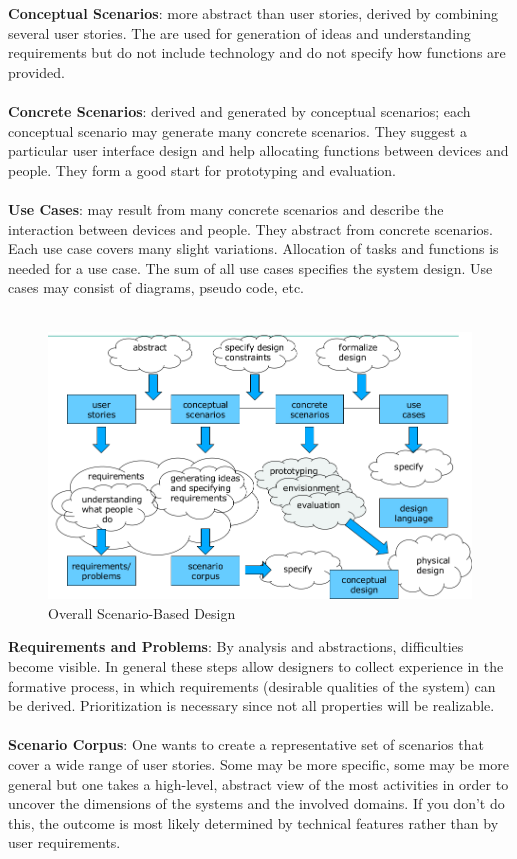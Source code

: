 \textbf{Conceptual Scenarios}: more abstract than user stories, derived by combining several user stories. The are used for generation of ideas and understanding requirements but do not include technology and do not specify how functions are provided.\\\\
\textbf{Concrete Scenarios}: derived and generated by conceptual scenarios; each conceptual scenario may generate many concrete scenarios. They suggest a particular user interface design and help allocating functions between devices and people. They form a good start for prototyping and evaluation. \\\\
\textbf{Use Cases}: may result from many concrete scenarios and describe the interaction between devices and people. They abstract from concrete scenarios. Each use case covers many slight variations. Allocation of tasks and functions is needed for a use case. The sum of all use cases specifies the system design. Use cases may consist of diagrams, pseudo code, etc.\\\\
\begin{figure}[h!]
	\centering
	\includegraphics[width=.8\textwidth]{img/ch06_scene2.png}
	\caption{Overall Scenario-Based Design}
	\label{scen2}
\end{figure}
\textbf{Requirements and Problems}: By analysis and abstractions, difficulties become visible. In general these steps allow designers to collect experience in the formative process, in which requirements (desirable qualities of the system) can be derived. Prioritization is necessary since not all properties will be realizable.\\\\
\textbf{Scenario Corpus}: One wants to create a representative set of scenarios that cover a wide range of user stories. Some may be more specific, some may be more general but one takes a high-level, abstract view of the most activities in order to uncover the dimensions of the systems and the involved domains. If you don't do this, the outcome is most likely determined by technical features rather than by user requirements.\\\\
